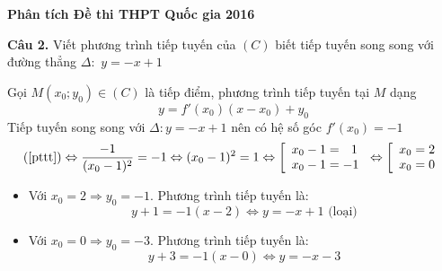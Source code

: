 \documentclass[11pt]{beamer} %
\newcommand{\cau}[2]{\begin{block}{}
		{\color{red}\textbf{Câu #1.}} #2
	\end{block}
}
\begin{document}
\begin{frame}{\textbf{\qquad Phân tích Đề thi THPT Quốc gia 2016}}
	\cau{2}{Viết phương trình tiếp tuyến của $(C)$ biết tiếp tuyến song song với đường thẳng $\Delta:$ $y=-x+1$}\pause
	Gọi $M(x_0;y_0)\in(C)$ là tiếp điểm, phương trình tiếp tuyến tại $M$ dạng \begin{equation}\label{pttt}
	y=f'(x_0)(x-x_0)+y_0
	\end{equation}
	Tiếp tuyến song song với $\Delta: y=-x+1$ nên có hệ số góc $f'(x_0)=-1$	
	$$(\ref{pttt})\Leftrightarrow \frac{-1}{(x_0-1)^2}=-1\Leftrightarrow (x_0-1)^2=1\Leftrightarrow \left[\begin{array}{l}
	x_0-1=~~1\\x_0-1=-1
	\end{array}\right.\Leftrightarrow
	\left[\begin{array}{l}
	x_0=2\\x_0=0
	\end{array}\right.$$\pause
	\begin{itemize}
		\item<+-> Với $x_0=2\Rightarrow y_0=-1$. Phương trình tiếp tuyến là: $$y+1=-1(x-2)\Leftrightarrow y=-x+1 \mbox{ (loại)}$$
		
		\item<+-> Với $x_0=0\Rightarrow y_0=-3$. Phương trình tiếp tuyến là: $$y+3=-1(x-0)\Leftrightarrow y=-x-3$$
	\end{itemize}~\\[25pt]
\end{frame}
\end{document}

